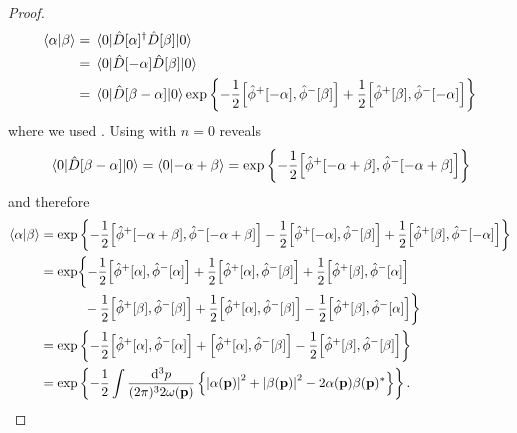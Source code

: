 \begin{proof}
	\begin{equation*}
		\begin{split}
			\braket{\alpha}{\beta}
			&=
			\expval{
				\hat{D}[\alpha]^\dagger
				\hat{D}[\beta]
			}{0}
			\\
			&=
			\expval{
				\hat{D}[-\alpha]
				\hat{D}[\beta]
			}{0}
			\\
			&=
			\expval{
				\hat{D}[\beta-\alpha]
			}{0}
			\exp\left\{
				-
				\frac{1}{2}
				\comm{\hat\phi^+[-\alpha]}{\hat\phi^-[\beta]}
				+
				\frac{1}{2}
				\comm{\hat\phi^+[\beta]}{\hat\phi^-[-\alpha]}
			\right\}
		\end{split}
	\end{equation*}
	where we used .
	Using  with $n=0$ reveals
	\begin{equation*}
		\expval{\hat{D}[\beta-\alpha]}{0}
		=
		\braket{0}{-\alpha+\beta}
		=
		\exp\left\{
			-
			\frac{1}{2}
			\comm{\hat\phi^+[-\alpha+\beta]}{\hat\phi^-[-\alpha+\beta]}
		\right\}
	\end{equation*}
	and therefore
	\begin{equation*}
		\begin{split}
			\braket{\alpha}{\beta}
			&=
			\exp\left\{
				-
				\frac{1}{2}
				\comm{\hat\phi^+[-\alpha+\beta]}{\hat\phi^-[-\alpha+\beta]}
				-
				\frac{1}{2}
				\comm{\hat\phi^+[-\alpha]}{\hat\phi^-[\beta]}
				+
				\frac{1}{2}
				\comm{\hat\phi^+[\beta]}{\hat\phi^-[-\alpha]}
			\right\}
			\\
			&=
			\exp\biggl\{
				-
				\frac{1}{2}
				\comm{\hat\phi^+[\alpha]}{\hat\phi^-[\alpha]}
				+
				\frac{1}{2}
				\comm{\hat\phi^+[\alpha]}{\hat\phi^-[\beta]}
				+
				\frac{1}{2}
				\comm{\hat\phi^+[\beta]}{\hat\phi^-[\alpha]}
				\\
				&\ \ \ \ \ \ \ \ \ \
				-
				\frac{1}{2}
				\comm{\hat\phi^+[\beta]}{\hat\phi^-[\beta]}
				+
				\frac{1}{2}
				\comm{\hat\phi^+[\alpha]}{\hat\phi^-[\beta]}
				-
				\frac{1}{2}
				\comm{\hat\phi^+[\beta]}{\hat\phi^-[\alpha]}
			\biggr\}
			\\
			&=
			\exp\left\{
				-
				\frac{1}{2}
				\comm{\hat\phi^+[\alpha]}{\hat\phi^-[\alpha]}
				+
				\comm{\hat\phi^+[\alpha]}{\hat\phi^-[\beta]}
				-
				\frac{1}{2}
				\comm{\hat\phi^+[\beta]}{\hat\phi^-[\beta]}
			\right\}
			\\
			&=
			\exp\left\{
				-
				\frac{1}{2}
				\int\frac{\dd[3]{p}}{(2\pi)^32\omega(\vb{p})}
				\left\{
					\abs{\alpha(\vb{p})}^2
					+
					\abs{\beta(\vb{p})}^2
					-
					2\alpha(\vb{p})\beta(\vb{p})^*
				\right\}
			\right\}
			.
		\end{split}
	\end{equation*}
\end{proof}

